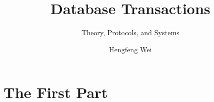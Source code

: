 \documentclass[a4paper, british]{memoir}
\title{Database Transactions}
\subtitle{Theory, Protocols, and Systems}
\author{Hengfeng Wei}
\begin{document}
    \frontmatter        %

    \mnfrontpage

    
    

    \cleartorecto
    \tableofcontents    %
    \cleartorecto
    \listoffigures      %
    \cleartorecto
    \listoftables       %

    \mainmatter         %

    

    \part{The First Part}




    \backmatter         %

    \printbibliography
\end{document}
